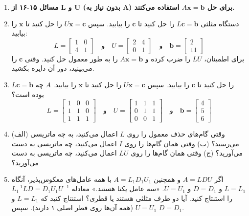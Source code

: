 \documentclass[12pt, a4paper]{book}
\begin{document}
\begin{enumerate}
		\item[] \textbf{مسائل ۱۵-۱۶ از L و U (بدون نیاز به A) برای حل $A\mathbf{x}=\mathbf{b}$ استفاده می‌کنند.}
		\item دستگاه مثلثی $L\mathbf{c}=\mathbf{b}$ را حل کنید تا $\mathbf{c}$ را بیابید. سپس $U\mathbf{x}=\mathbf{c}$ را حل کنید تا $\mathbf{x}$ را بیابید:
		\[ L = \begin{bmatrix} 1 & 0 \\ 4 & 1 \end{bmatrix} \quad \text{و} \quad U = \begin{bmatrix} 2 & 4 \\ 0 & 1 \end{bmatrix} \quad \text{و} \quad \mathbf{b} = \begin{bmatrix} 2 \\ 11 \end{bmatrix} \]
		برای اطمینان، $LU$ را ضرب کرده و $A\mathbf{x}=\mathbf{b}$ را به طور معمول حل کنید. وقتی $\mathbf{c}$ را می‌بینید، دور آن دایره بکشید.
		
		\item $L\mathbf{c}=\mathbf{b}$ را حل کنید تا $\mathbf{c}$ را بیابید. سپس $U\mathbf{x}=\mathbf{c}$ را حل کنید تا $\mathbf{x}$ را بیابید. $A$ چه بوده است؟
		\[ L = \begin{bmatrix} 1 & 0 & 0 \\ 1 & 1 & 0 \\ 1 & 1 & 1 \end{bmatrix} \quad \text{و} \quad U = \begin{bmatrix} 1 & 1 & 1 \\ 0 & 1 & 1 \\ 0 & 0 & 1 \end{bmatrix} \quad \text{و} \quad \mathbf{b} = \begin{bmatrix} 4 \\ 5 \\ 6 \end{bmatrix} \]
		
		\item (الف) وقتی گام‌های حذف معمول را روی $L$ اعمال می‌کنید، به چه ماتریسی می‌رسید؟
		(ب) وقتی همان گام‌ها را روی $I$ اعمال می‌کنید، چه ماتریسی به دست می‌آورید؟
		(ج) وقتی همان گام‌ها را روی $LU$ اعمال می‌کنید، چه ماتریسی به دست می‌آورید؟
		
		\item اگر $A=LDU$ و همچنین $A=L_1D_1U_1$ با همه عامل‌های معکوس‌پذیر، آنگاه $L=L_1$ و $D=D_1$ و $U=U_1$. «سه عامل یکتا هستند.»
		معادله $L_1^{-1}LD = D_1U_1U^{-1}$ را استنتاج کنید. آیا دو طرف مثلثی هستند یا قطری؟ استنتاج کنید که $L=L_1$ و $U=U_1$ (همه آن‌ها روی قطر اصلی ۱ دارند). سپس $D=D_1$.
		

\end{enumerate}
\end{document}
